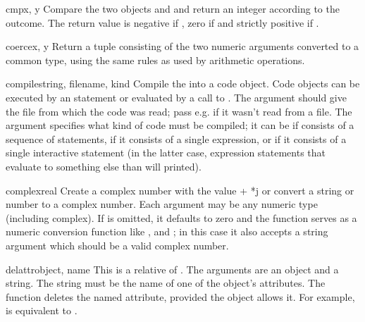 \begin{funcdesc}{cmp}{x, y}
  Compare the two objects  and  and return an integer
  according to the outcome.  The return value is negative if , zero if  and strictly positive if
  .
\end{funcdesc}

\begin{funcdesc}{coerce}{x, y}
  Return a tuple consisting of the two numeric arguments converted to
  a common type, using the same rules as used by arithmetic
  operations.
\end{funcdesc}

\begin{funcdesc}{compile}{string, filename, kind}
  Compile the  into a code object.  Code objects can be
  executed by an  statement or evaluated by a call to
  .  The  argument should
  give the file from which the code was read; pass e.g. 
  if it wasn't read from a file.  The  argument specifies
  what kind of code must be compiled; it can be  if
   consists of a sequence of statements, 
  if it consists of a single expression, or  if
  it consists of a single interactive statement (in the latter case,
  expression statements that evaluate to something else than
   will printed).
\end{funcdesc}

\begin{funcdesc}{complex}{real}
  Create a complex number with the value  + *j or
  convert a string or number to a complex number.
  Each argument may be any numeric type (including complex).
  If  is omitted, it defaults to zero and the function
  serves as a numeric conversion function like ,
   and ; in this case it also
  accepts a string argument which should be a valid complex number.
\end{funcdesc}

\begin{funcdesc}{delattr}{object, name}
  This is a relative of .  The arguments are an
  object and a string.  The string must be the name
  of one of the object's attributes.  The function deletes
  the named attribute, provided the object allows it.  For example,
   is equivalent to
  .
\end{funcdesc}


